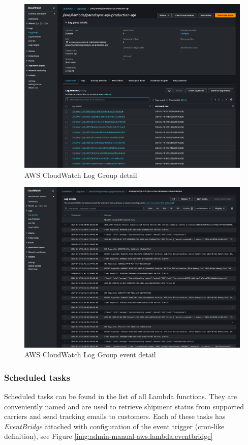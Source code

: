 \begin{figure}[p]\centering
\includegraphics[width=140mm]{img/docs/fig_aws_loggroup.png}
\caption{AWS CloudWatch Log Group detail}
\label{img:admin-manual-aws.lambda.log.detail}
\end{figure}

\begin{figure}[p]\centering
\includegraphics[width=140mm]{img/docs/fig_aws_log_event.png}
\caption{AWS CloudWatch Log Group event detail}
\label{img:admin-manual-aws.lambda.log.event.detail}
\end{figure}

\subsubsection{Scheduled tasks}
Scheduled tasks can be found in the list of all Lambda functions.
They are conveniently named and are used to retrieve shipment status from supported carriers and send tracking emails to customers.
Each of these tasks has \textit{EventBridge} attached with configuration of the event trigger (cron-like definition), see Figure \ref{img:admin-manual-aws.lambda.eventbridge}

